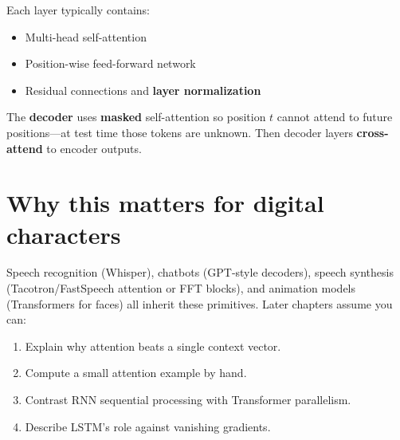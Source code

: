 Each layer typically contains:
\begin{itemize}
  \item Multi-head self-attention
  \item Position-wise feed-forward network
  \item Residual connections and \textbf{layer normalization}
\end{itemize}

The \textbf{decoder} uses \textbf{masked} self-attention so position $t$ cannot attend to future positions---at test time those tokens are unknown. Then decoder layers \textbf{cross-attend} to encoder outputs.


\section{Why this matters for digital characters}

Speech recognition (Whisper), chatbots (GPT-style decoders), speech synthesis (Tacotron/FastSpeech attention or FFT blocks), and animation models (Transformers for faces) all inherit these primitives. Later chapters assume you can:
\begin{enumerate}
  \item Explain why attention beats a single context vector.
  \item Compute a small attention example by hand.
  \item Contrast RNN sequential processing with Transformer parallelism.
  \item Describe LSTM's role against vanishing gradients.
\end{enumerate}
